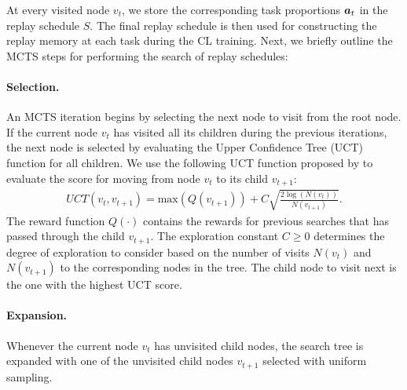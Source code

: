 At every visited node $v_t$, we store the corresponding task proportions ${\bm{a}}_t$ in the replay schedule $S$. The final replay schedule is then used for constructing the replay memory at each task during the CL training.  
Next, we briefly outline the MCTS steps for performing the search of replay schedules: 

\setlength{\abovedisplayskip}{0pt}
\setlength{\belowdisplayskip}{0pt}
\setlength{\abovedisplayshortskip}{0pt}
\setlength{\belowdisplayshortskip}{0pt}

\vspace{-3mm}
\paragraph{Selection.} An MCTS iteration begins by selecting the next node to visit from the root node. If the current node $v_t$ has visited all its children during the previous iterations, the next node is selected by evaluating the Upper Confidence Tree (UCT)~ function for all children. 
We use the following UCT function proposed by  to evaluate the score for moving from node $v_t$ to its child $v_{t+1}$:
\begin{align}\label{eq:uct}
    UCT(v_t, v_{t+1}) = \text{max}(Q(v_{t+1})) + C \sqrt{\frac{2 \log(N(v_{t}))}{N(v_{t+1})}}.
\end{align}
The reward function $Q(\cdot)$ contains the rewards for previous searches that has passed through the child $v_{t+1}$. 
The exploration constant $C \geq 0$ determines the degree of exploration to consider based on the number of visits $N(v_t)$ and $N(v_{t+1})$ to the corresponding nodes in the tree. %
The child node to visit next is the one with the highest UCT score.  

\vspace{-3mm}
\paragraph{Expansion.} Whenever the current node $v_t$ has unvisited child nodes, the search tree is expanded with one of the unvisited child nodes $v_{t+1}$ selected with uniform sampling. 


\vspace{-3mm}
